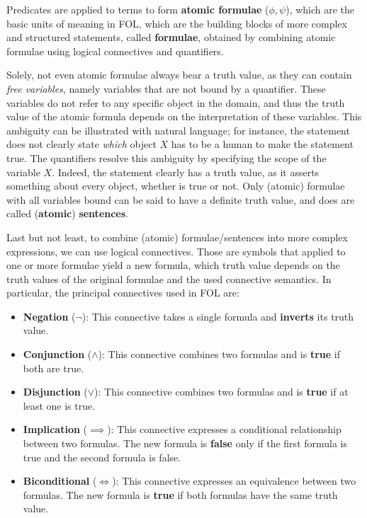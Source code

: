 Predicates are applied to terms to form \textbf{atomic formulae} (\(\phi,\psi\)), which are the basic units of meaning in FOL, which are the building blocks of more complex and structured statements, called \textbf{formulae}, obtained by combining atomic formulae using logical connectives and quantifiers.

Solely, not even atomic formulae always bear a truth value, as they can contain \textit{free variables}, namely variables that are not bound by a quantifier. These variables do not refer to any specific object in the domain, and thus the truth value of the atomic formula depends on the interpretation of these variables.
This ambiguity can be illustrated with natural language; for instance, the statement  does not clearly state \textit{which} object \(X\) has to be a human to make the statement true.
The quantifiers resolve this ambiguity by specifying the scope of the variable \(X\). Indeed, the statement  clearly has a truth value, as it asserts something about every object, whether is true or not.
Only (atomic) formulae with all variables bound can be said to have a definite truth value, and does are called (\textbf{atomic}) \textbf{sentences}.

Last but not least, to combine (atomic) formulae/sentences into more complex expressions, we can use logical connectives. Those are symbols that applied to one or more formulae yield a new formula, which truth value depends on the truth values of the original formulae and the used connective semantics.
In particular, the principal connectives used in FOL are:

\begin{itemize}
  \item \textbf{Negation} (\(\neg\)): This connective takes a single formula and \textbf{inverts} its truth value.
  \item \textbf{Conjunction} (\(\land\)): This connective combines two formulas and is \textbf{true} if both are true.
  \item \textbf{Disjunction} (\(\lor\)): This connective combines two formulas and is \textbf{true} if at least one is true.
  \item \textbf{Implication} (\(\implies\)): This connective expresses a conditional relationship between two formulas. The new formula is \textbf{false} only if the first formula is true and the second formula is false.
  \item \textbf{Biconditional} (\(\iff\)): This connective expresses an equivalence between two formulas. The new formula is \textbf{true} if both formulas have the same truth value.
\end{itemize}

